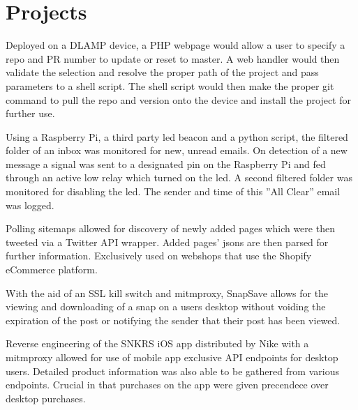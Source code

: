 \documentclass[]{deedy-resume-openfont}
\begin{document}
\begin{minipage}[t]{0.67\textwidth}

\section{Projects}
Deployed on a DLAMP device, a PHP webpage would allow a user to specify a repo and PR number to update or reset to master. A web handler would then validate the selection and resolve the proper path of the project and pass parameters to a shell script. The shell script would then make the proper git command to pull the repo and version onto the device and install the project for further use.
\sectionsep

Using a Raspberry Pi, a third party led beacon and a python script, the filtered folder
of an inbox was monitored for new, unread emails. On detection of a new message a
signal was sent to a designated pin on the Raspberry Pi and fed through an active low
relay which turned on the led. A second filtered folder was monitored for disabling
the led. The sender and time of this ”All Clear” email was logged.
\sectionsep

Polling sitemaps allowed for discovery of newly added pages which were then tweeted via a Twitter API wrapper.
Added pages' jsons are then
parsed for further information.
Exclusively used on webshops
that use the Shopify eCommerce platform.
\sectionsep


With the aid of an SSL kill switch and mitmproxy, SnapSave allows for the viewing and
downloading of a snap on a users desktop without voiding the expiration of the post
or notifying the sender that their post has been viewed.
\sectionsep

Reverse engineering of the SNKRS iOS app distributed by Nike with a mitmproxy
allowed for use of mobile app exclusive API endpoints for desktop users. Detailed
product information was also able to be gathered from various endpoints. Crucial in
that purchases on the app were given precendece over desktop purchases.
\sectionsep
\end{minipage} 
\end{document}
